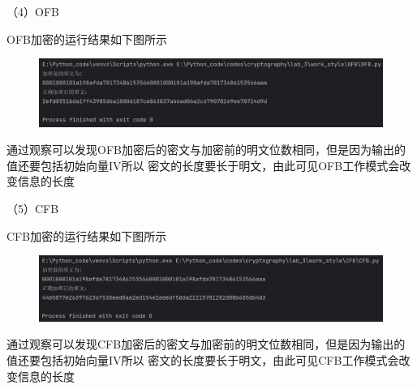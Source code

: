 \documentclass[a4paper,11pt,UTF8]{ctexart}
\newcommand{\bottomcaption}{%
\setlength{\abovecaptionskip}{6pt}%
\setlength{\belowcaptionskip}{6pt}%
\caption}
\newcommand{\xiaowuhao}{\fontsize{9pt}{\baselineskip}\selectfont}   %
\begin{document}
            （4）OFB\par
                OFB加密的运行结果如下图所示
                \begin{figure}[H]
                    \centering
                    \includegraphics[width=13cm]{OFB_result_4.png}
                    \bottomcaption{\xiaowuhao{OFB加密结果}}
                \end{figure}
                通过观察可以发现OFB加密后的密文与加密前的明文位数相同，但是因为输出的值还要包括初始向量IV所以
                密文的长度要长于明文，由此可见OFB工作模式会改变信息的长度

            （5）CFB\par
                CFB加密的运行结果如下图所示
                \begin{figure}[H]
                    \centering
                    \includegraphics[width=13cm]{CFB_result_4.png}
                    \bottomcaption{\xiaowuhao{CFB加密结果}}
                \end{figure}
                通过观察可以发现CFB加密后的密文与加密前的明文位数相同，但是因为输出的值还要包括初始向量IV所以
                密文的长度要长于明文，由此可见CFB工作模式会改变信息的长度
\end{document}
